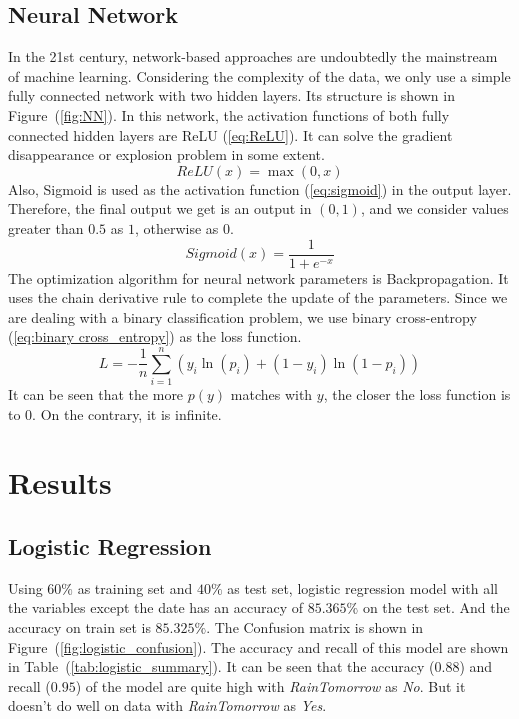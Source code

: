 \documentclass[11pt, a4paper, jou]{apa7}
\begin{document}
\subsection{Neural Network}
    In the 21st century, network-based approaches are undoubtedly the mainstream of machine learning. Considering the complexity of the data, we only use a simple fully connected network with two hidden layers. Its structure is shown in Figure~(\ref{fig:NN}). In this network, the activation functions of both fully connected hidden layers are ReLU\cite{Lu2020} (\ref{eq:ReLU}). It can solve the gradient disappearance or explosion problem in some extent. 
    \begin{equation}
        \label{eq:ReLU}
        ReLU(x) = \max(0,x)
    \end{equation}
    Also, Sigmoid is used as the activation function (\ref{eq:sigmoid}) in the output layer. Therefore, the final output we get is an output in $(0,1)$, and we consider values greater than $0.5$ as $1$, otherwise as $0$. 
    \begin{equation}
        \label{eq:sigmoid}
        Sigmoid(x) = \frac{1}{1+e^{-x}}
    \end{equation}
    The optimization algorithm for neural network parameters is Backpropagation\cite{goodfellow20166}. It uses the chain derivative rule to complete the update of the parameters. Since we are dealing with a binary classification problem, we use binary cross-entropy (\ref{eq:binary cross_entropy}) as the loss function. 
    \begin{equation}
        \label{eq:binary cross_entropy}
        L = -\frac{1}{n}\sum_{i=1}^{n}(y_i\ln(p_i)+(1-y_i)\ln(1-p_i))
    \end{equation}
    It can be seen that the more $p(y)$ matches with $y$, the closer the loss function is to $0$. On the contrary, it is infinite. 

\section{Results}

\subsection{Logistic Regression}
    Using $60\%$ as training set and $40\%$ as test set, logistic regression model with all the variables except the date has an accuracy of $85.365\%$ on the test set. And the accuracy on train set is $85.325\%$. The Confusion matrix is shown in Figure~(\ref{fig:logistic_confusion}). The accuracy and recall of this model are shown in Table~(\ref{tab:logistic_summary}). It can be seen that the accuracy ($0.88$) and recall ($0.95$) of the model are quite high with \emph{RainTomorrow} as \emph{No}. But it doesn't do well on data with \emph{RainTomorrow} as \emph{Yes}. 
\end{document}
